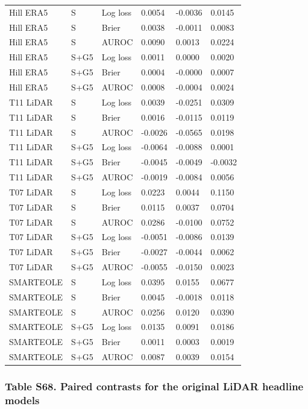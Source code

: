 \documentclass[a4paper,11pt]{article}
\begin{document}
{\begin{longtable}[]{@{}llllll@{}}
Hill ERA5 & S & Log loss & 0.0054 & -0.0036 & 0.0145 \\
Hill ERA5 & S & Brier & 0.0038 & -0.0011 & 0.0083 \\
Hill ERA5 & S & AUROC & 0.0090 & 0.0013 & 0.0224 \\
Hill ERA5 & S+G5 & Log loss & 0.0011 & 0.0000 & 0.0020 \\
Hill ERA5 & S+G5 & Brier & 0.0004 & -0.0000 & 0.0007 \\
Hill ERA5 & S+G5 & AUROC & 0.0008 & -0.0004 & 0.0024 \\
T11 LiDAR & S & Log loss & 0.0039 & -0.0251 & 0.0309 \\
T11 LiDAR & S & Brier & 0.0016 & -0.0115 & 0.0119 \\
T11 LiDAR & S & AUROC & -0.0026 & -0.0565 & 0.0198 \\
T11 LiDAR & S+G5 & Log loss & -0.0064 & -0.0088 & 0.0001 \\
T11 LiDAR & S+G5 & Brier & -0.0045 & -0.0049 & -0.0032 \\
T11 LiDAR & S+G5 & AUROC & -0.0019 & -0.0084 & 0.0056 \\
T07 LiDAR & S & Log loss & 0.0223 & 0.0044 & 0.1150 \\
T07 LiDAR & S & Brier & 0.0115 & 0.0037 & 0.0704 \\
T07 LiDAR & S & AUROC & 0.0286 & -0.0100 & 0.0752 \\
T07 LiDAR & S+G5 & Log loss & -0.0051 & -0.0086 & 0.0139 \\
T07 LiDAR & S+G5 & Brier & -0.0027 & -0.0044 & 0.0062 \\
T07 LiDAR & S+G5 & AUROC & -0.0055 & -0.0150 & 0.0023 \\
SMARTEOLE & S & Log loss & 0.0395 & 0.0155 & 0.0677 \\
SMARTEOLE & S & Brier & 0.0045 & -0.0018 & 0.0118 \\
SMARTEOLE & S & AUROC & 0.0256 & 0.0120 & 0.0390 \\
SMARTEOLE & S+G5 & Log loss & 0.0135 & 0.0091 & 0.0186 \\
SMARTEOLE & S+G5 & Brier & 0.0011 & 0.0003 & 0.0019 \\
SMARTEOLE & S+G5 & AUROC & 0.0087 & 0.0039 & 0.0154 \\
\end{longtable}
}

\subsubsection{Table S68. Paired contrasts for the original LiDAR headline models}\label{table-s68.-paired-contrasts-for-the-original-lidar-headline-models}
\end{document}
